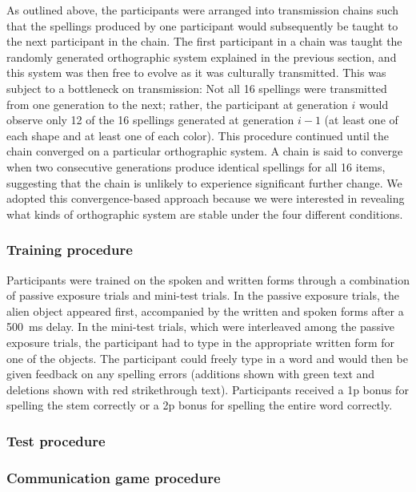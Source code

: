 \documentclass[doc,biblatex]{apa7}
\begin{document}
As outlined above, the participants were arranged into transmission chains such that the spellings produced by one participant would subsequently be taught to the next participant in the chain. The first participant in a chain was taught the randomly generated orthographic system explained in the previous section, and this system was then free to evolve as it was culturally transmitted. This was subject to a bottleneck on transmission: Not all 16 spellings were transmitted from one generation to the next; rather, the participant at generation $i$ would observe only 12 of the 16 spellings generated at generation $i-1$ (at least one of each shape and at least one of each color). This procedure continued until the chain converged on a particular orthographic system. A chain is said to converge when two consecutive generations produce identical spellings for all 16 items, suggesting that the chain is unlikely to experience significant further change. We adopted this convergence-based approach because we were interested in revealing what kinds of orthographic system are stable under the four different conditions.

\subsubsection{Training procedure}

Participants were trained on the spoken and written forms through a combination of passive exposure trials and mini-test trials. In the passive exposure trials, the alien object appeared first, accompanied by the written and spoken forms after a 500~ms delay. In the mini-test trials, which were interleaved among the passive exposure trials, the participant had to type in the appropriate written form for one of the objects. The participant could freely type in a word and would then be given feedback on any spelling errors (additions shown with green text and deletions shown with red strikethrough text). Participants received a 1p bonus for spelling the stem correctly or a 2p bonus for spelling the entire word correctly.

\subsubsection{Test procedure}



\subsubsection{Communication game procedure}
\end{document}
